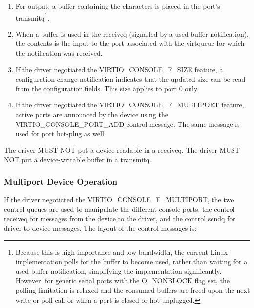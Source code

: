 \begin{enumerate}
\item For output, a buffer containing the characters is placed in
  the port's transmitq\footnote{Because this is high importance and low bandwidth, the current
Linux implementation polls for the buffer to become used, rather than
waiting for a used buffer notification, simplifying the implementation
significantly. However, for generic serial ports with the
O_NONBLOCK flag set, the polling limitation is relaxed and the
consumed buffers are freed upon the next write or poll call or
when a port is closed or hot-unplugged.
}.

\item When a buffer is used in the receiveq (signalled by a
  used buffer notification), the contents is the input to the port associated
  with the virtqueue for which the notification was received.

\item If the driver negotiated the VIRTIO_CONSOLE_F_SIZE feature, a
  configuration change notification indicates that the updated size can
  be read from the configuration fields.  This size applies to port 0 only.

\item If the driver negotiated the VIRTIO_CONSOLE_F_MULTIPORT
  feature, active ports are announced by the device using the
  VIRTIO_CONSOLE_PORT_ADD control message. The same message is
  used for port hot-plug as well.
\end{enumerate}


The driver MUST NOT put a device-readable in a receiveq. The driver
MUST NOT put a device-writable buffer in a transmitq.

\subsubsection{Multiport Device Operation}\label{sec:Device Types / Console Device / Device Operation / Multiport Device Operation}

If the driver negotiated the VIRTIO_CONSOLE_F_MULTIPORT, the two
control queues are used to manipulate the different console ports: the
control receiveq for messages from the device to the driver, and the
control sendq for driver-to-device messages.  The layout of the
control messages is:

